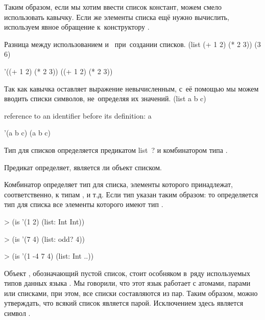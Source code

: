 Таким образом, если мы хотим ввести список констант, можем смело использовать кавычку. Если же элементы списка ещё нужно вычислить, используем явное обращение к~конструктору .

\begin{example}{Разница между использованием  и~ при~создании списков.}
\REPL
  {(list (+ 1 2) (* 2 3))}
  {(3 6)}

\REPL
  {'((+ 1 2) (* 2 3))}
  {((+ 1 2) (* 2 3))}
\end{example}

\begin{example}{Так как кавычка оставляет выражение невычисленным, с~её помощью мы можем вводить списки символов, не~определяя их значений.}
\REPLin
  {(list a b c)}

{\errorstyle reference to an identifier before its definition: a}

\REPL
  {'(a b c)}
  {(a b c)}
\end{example}

Тип для списков определяется предикатом \si{list?} и комбинатором типа .

\begin{example}{Предикат  определяет, является ли объект списком.}
\end{example}

\begin{example}{Комбинатор  определяет тип для списка, элементы которого принадлежат, соответственно, к типам ,  и т.д. Если тип указан таким образом:  то определяется тип для списка все элементы которого имеют тип .}
\begin{ExampleCode}
> (is '(1 2) 
      (list: Int Int))
\end{ExampleCode}
\begin{ExampleCode}
> (is '(7 4) 
      (list: odd? 4))
\end{ExampleCode}
\begin{ExampleCode}
> (is '(1 -4 7 4) 
      (list: Int ..))
\end{ExampleCode}
\end{example}

%
Объект , обозначающий пустой список, стоит особняком в~ряду используемых типов данных языка \Scheme. Мы говорили, что этот язык работает с атомами, парами или списками, при этом, все списки составляются из пар. Таким образом, можно утверждать, что всякий список является парой. Исключением здесь является символ .

